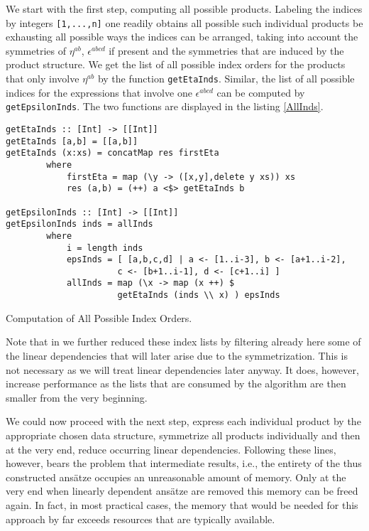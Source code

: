 We start with the first step, computing all possible products. Labeling the indices by integers \texttt{[1,...,n]} one readily obtains all possible such individual products be exhausting all possible ways the indices can be arranged, taking into account the symmetries of $\eta^{ab}$, $\epsilon^{abcd}$ if present and the symmetries that are induced by the product structure. We get the list of all possible index orders for the products that only involve $\eta^{ab}$ by the function \texttt{getEtaInds}.
Similar, the list of all possible indices for the expressions that involve one $\epsilon^{abcd}$ can be computed by \texttt{getEpsilonInds}. The two functions are displayed in the listing \ref{AllInds}.
\begin{listing}[hbt!]
\begin{verbatim}
getEtaInds :: [Int] -> [[Int]]
getEtaInds [a,b] = [[a,b]]
getEtaInds (x:xs) = concatMap res firstEta
        where
            firstEta = map (\y -> ([x,y],delete y xs)) xs
            res (a,b) = (++) a <$> getEtaInds b 

getEpsilonInds :: [Int] -> [[Int]]
getEpsilonInds inds = allInds
        where
            i = length inds 
            epsInds = [ [a,b,c,d] | a <- [1..i-3], b <- [a+1..i-2],
                      c <- [b+1..i-1], d <- [c+1..i] ] 
            allInds = map (\x -> map (x ++) $
                      getEtaInds (inds \\ x) ) epsInds 
\end{verbatim} 
\caption{Computation of All Possible Index Orders.}\label{AllInds}
\end{listing}

Note that in \cite{sparse-tensor} we further reduced these index lists by filtering already here some of the linear dependencies that will later arise due to the symmetrization. This is not necessary as we will treat linear dependencies later anyway. It does, however, increase performance as the lists that are consumed by the algorithm are then smaller from the very beginning.  

We could now proceed with the next step, express each individual product by the appropriate chosen data structure, symmetrize all products individually and then at the very end, reduce occurring linear dependencies. Following these lines, however, bears the problem that intermediate results, i.e., the entirety of the thus constructed ansätze occupies an unreasonable amount of memory. Only at the very end when linearly dependent ansätze are removed this memory can be freed again. In fact, in most practical cases, the memory that would be needed for this approach by far exceeds resources that are typically available.

